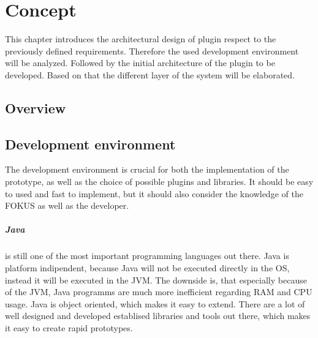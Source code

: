 \chapter{Concept}\label{chapter:concept}
This chapter introduces the architectural design of plugin respect to the previously defined requirements.
Therefore the used development environment will be analyzed.
Followed by the initial architecture of the plugin to be developed.
Based on that the different layer of the system will be elaborated.

\section{Overview}
\doit

\section{Development environment}
The development environment is crucial for both the implementation of the prototype, as well as the choice of possible plugins and libraries.
It should be easy to used and fast to implement, but it should also consider the knowledge of the \ac{FOKUS} as well as the developer.

\paragraph{Java} is still one of the most important programming languages out there.\autocite[cf.]{ProgramminLanguage:2017}
Java is platform indipendent, because Java will not be executed directly in the \ac{OS}, instead it will be executed in the \ac{JVM}.
The downside is, that especially because of the \ac{JVM}, Java programms are much more inefficient regarding \ac{RAM} and \ac{CPU} usage.
Java is object oriented, which makes it easy to extend.
There are a lot of well designed and developed establised libraries and tools out there, which makes it easy to create rapid prototypes.

